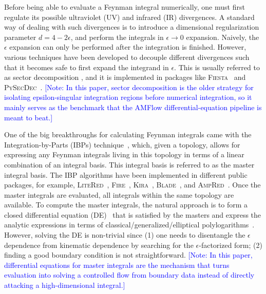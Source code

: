 \documentclass[a4paper,11pt]{article}
\makeatletter
\def\textcolor#1#{\kg@textcolor{#1}}
\makeatother
\begin{document}
Before being able to evaluate a Feynman integral numerically, one must first regulate its possible ultraviolet (UV)  and infrared (IR) divergences. A standard way of dealing with such divergences is to introduce a dimensional regularization parameter $d=4-2\epsilon$, and perform the integrals in $\epsilon\to 0$ expansion. Naively, the $\epsilon$ expansion can only be performed after the integration is finished. However, various techniques have been developed to decouple different divergences such that it becomes safe to first expand the integrand in $\epsilon$. This is usually referred to as sector decomposition \cite{Binoth:2000ps, Binoth:2003ak, Binoth:2004jv, Heinrich:2008si}, and it is implemented in packages like \textsc{Fiesta}~\cite{Smirnov:2008py,Smirnov:2009pb,Smirnov:2013eza,Smirnov:2015mct,Smirnov:2021rhf} and \textsc{PySecDec}~\cite{Borowka:2012yc, Borowka:2015mxa, Borowka:2017idc, Borowka:2018goh, Heinrich:2021dbf, Heinrich:2023til}. 
\textcolor{blue}{\small [Note: In this paper, sector decomposition is the older strategy for isolating epsilon-singular integration regions before numerical integration, so it mainly serves as the benchmark that the AMFlow differential-equation pipeline is meant to beat.]}



One of the big breakthroughs for calculating Feynman integrals came with the Integration-by-Parts (IBPs) technique~\cite{Tkachov:1981wb,Chetyrkin:1981qh}, which, given a topology, allows for expressing any Feynman integrals living in this topology in terms of a linear combination of an integral basis. This integral basis is referred to as the master integral basis. The IBP algorithms have been implemented in different public packages, for example, \textsc{LiteRed}~\cite{Lee:2012cn,Lee:2013mka}, \textsc{Fire}~\cite{Smirnov:2008iw,Smirnov:2014hma,Smirnov:2019qkx, Smirnov:2023yhb}, \textsc{Kira}~\cite{Maierhofer:2017gsa,Klappert:2020nbg,Lange:2025fba}, \textsc{Blade}~\cite{Liu:2018dmc, Guan:2019bcx, Guan:2024byi}, and \textsc{AmpRed}~\cite{Chen:2024xwt}. Once the master integrals are evaluated, all integrals within the same topology are available. To compute the master integrals, the natural approach is to form a closed differential equation (DE)~\cite{Kotikov:1990kg,Kotikov:1991pm,Bern:1993kr,Remiddi:1997ny, Henn:2013pwa} that is satisfied by the masters and express the analytic expressions in terms of classical/generalized/elliptical polylogarithms~\cite{Goncharov:1998kja, Goncharov:2001iea, Goncharov:2010jf, Duhr:2011zq, Duhr:2012fh}. However, solving the DE is non-trivial since (1) one needs to disentangle the $\epsilon$ dependence from kinematic dependence by searching for the $\epsilon$-factorized form; (2) finding a good boundary condition is not straightforward. 
\textcolor{blue}{\small [Note: In this paper, differential equations for master integrals are the mechanism that turns evaluation into solving a controlled flow from boundary data instead of directly attacking a high-dimensional integral.]}
\end{document}
